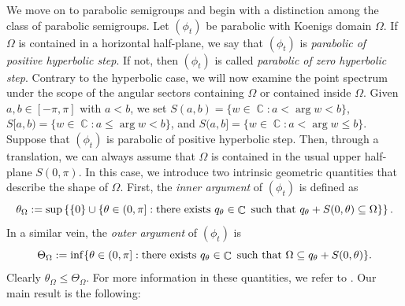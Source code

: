 \documentclass[11pt]{amsart}
\numberwithin{equation}{section}
\theoremstyle{definition}
\DeclareMathOperator{\C}{\mathbb{C}}
\begin{document}
	We move on to parabolic semigroups and begin with a distinction among the class of parabolic semigroups. Let $(\phi_t)$ be parabolic with Koenigs domain $\Omega$. If $\Omega$ is contained in a horizontal half-plane, we say that $(\phi_t)$ is \textit{parabolic of positive hyperbolic step}. If not, then $(\phi_t)$ is called \textit{parabolic of zero hyperbolic step}. Contrary to the hyperbolic case, we will now examine the point spectrum under the scope of the angular sectors containing $\Omega$ or contained inside $\Omega$. Given $a,b\in[-\pi,\pi]$ with $a<b$, we set $S(a,b)=\{w\in\C:a<\arg w<b\}$, $S[a,b)=\{w\in\C: a\le \arg w<b\}$, and $S(a,b]=\{w\in\C: a<\arg w\le b\}$. Suppose that $(\phi_t)$ is parabolic of positive hyperbolic step. Then, through a translation, we can always assume that $\Omega$ is contained in the usual upper half-plane $S(0,\pi)$. In this case, we introduce two intrinsic geometric quantities that describe the shape of $\Omega$. First, the \textit{inner argument} of $(\phi_t)$ is defined as
	\begin{equation}\label{eq:inner argument}
		\theta_\Omega:=\sup\left\{\{0\}\cup\{\theta\in(0,\pi]: \textup{there exists }q_\theta\in\C \textup{ such that }q_\theta+S(0,\theta)\subseteq\Omega\}\right\}.
	\end{equation}
	In a similar vein, the \textit{outer argument} of $(\phi_t)$ is
	\begin{equation}\label{eq:outer argument}
		\Theta_\Omega:=\inf\{\theta\in(0,\pi]: \textup{there exists }q_\theta\in\C \textup{ such that }\Omega\subseteq q_\theta+S(0,\theta)\}.
	\end{equation}
	Clearly $\theta_\Omega\le\Theta_\Omega$. For more information in these quantities, we refer to \cite[Section 3]{our_finiteshift}. Our main result is the following:
	
\end{document}
